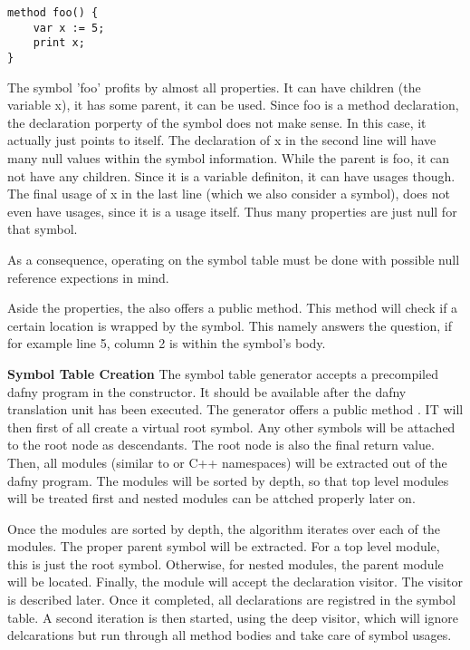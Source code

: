 \begin{lstlisting}[language=dafny, caption={Example Code Regarding Symbol Information}, captionpos=b, label={lst:aldbkajds}]
method foo() {
    var x := 5;
    print x;
}
\end{lstlisting}

The symbol 'foo' profits by almost all properties.
It can have children (the variable x), it has some parent, it can be used.
Since foo is a method declaration, the declaration porperty of the symbol does not make sense.
In this case, it actually just points to itself.
The declaration of x in the second line will have many null values within the symbol information.
While the parent is foo, it can not have any children.
Since it is a variable definiton, it can have usages though.
The final usage of x in the last line (which we also consider a symbol), does not even have usages, since it is a usage itself.
Thus many properties are just null for that symbol.

As a consequence, operating on the symbol table must be done with possible null reference expections in mind.

Aside the properties, the  also offers a public method.
This method will check if a certain location is wrapped by the symbol.
This namely answers the question, if for example line 5, column 2 is within the symbol's body.

\textbf{Symbol Table Creation}
The symbol table generator accepts a precompiled dafny program in the constructor.
It should be available after the dafny translation unit has been executed.
The generator offers a public method .
IT will then first of all create a virtual root symbol.
Any other symbols will be attached to the root node as descendants.
The root node is also the final return value.\\

Then, all modules (similar to \Csharp or C++ namespaces) will be extracted out of the dafny program.
The modules will be sorted by depth, so that top level modules will be treated first and nested modules can be attched properly later on.

Once the modules are sorted by depth, the algorithm iterates over each of the modules.
The proper parent symbol will be extracted.
For a top level module, this is just the root symbol.
Otherwise, for nested modules, the parent module will be located.
Finally, the module will accept the declaration visitor.
The visitor is described later.
Once it completed, all declarations are registred in the symbol table.
A second iteration is then started, using the deep visitor, which will ignore delcarations but run through all method bodies and take care of symbol usages.

